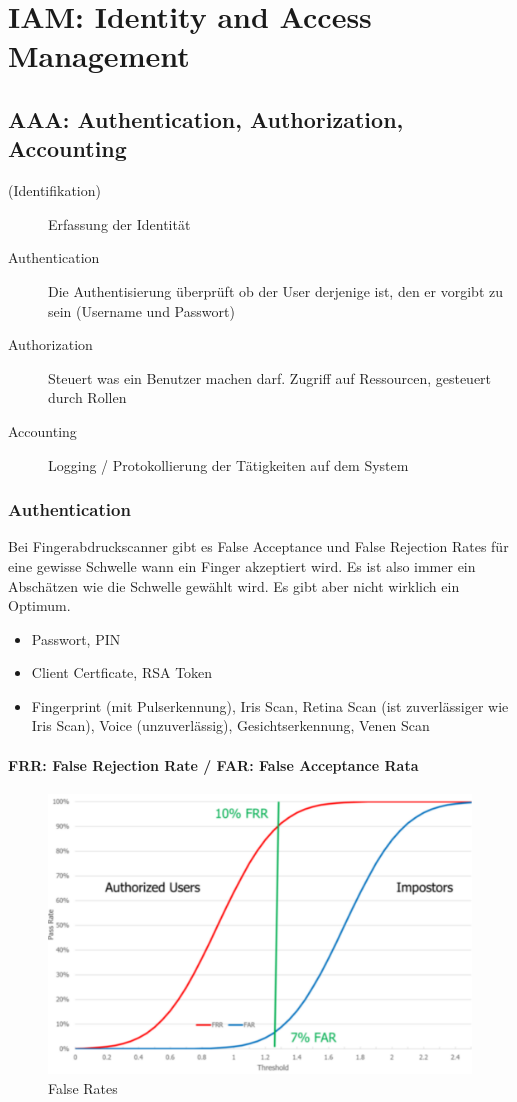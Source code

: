 \section{IAM: Identity and Access Management}

\subsection{AAA: Authentication, Authorization, Accounting}
\begin{description}
	\item[(Identifikation)] Erfassung der Identität
	\item[Authentication] Die Authentisierung überprüft ob der User 
	derjenige ist, den er vorgibt zu sein (Username und Passwort)
	\item[Authorization] Steuert was ein Benutzer machen darf. Zugriff auf Ressourcen, gesteuert durch Rollen
	\item[Accounting] Logging / Protokollierung der Tätigkeiten auf dem System
\end{description}

\subsubsection{Authentication}
Bei Fingerabdruckscanner gibt es False Acceptance und False Rejection Rates für eine gewisse Schwelle wann ein Finger akzeptiert wird. Es ist also immer ein Abschätzen wie die Schwelle gewählt wird. Es gibt aber nicht wirklich ein Optimum.
\begin{itemize}
	\item Passwort, PIN
	\item Client Certficate, RSA Token
	\item Fingerprint (mit Pulserkennung), Iris Scan, Retina Scan (ist zuverlässiger wie Iris Scan), Voice (unzuverlässig), Gesichtserkennung, Venen Scan
\end{itemize}

\paragraph{FRR: False Rejection Rate / FAR: False Acceptance Rata}
\begin{figure}[h]
\centering
\includegraphics[width=0.5\linewidth]{images/false_rates}
\caption{False Rates}
\end{figure}

